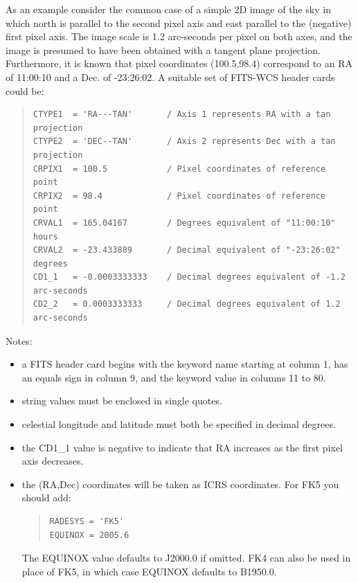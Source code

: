 \documentclass[twoside,11pt]{article}
\begin{document}
As an example consider the common case of a simple 2D image of the sky in 
which north is parallel to the second pixel axis and east parallel to the 
(negative) first pixel axis. The image scale is 1.2 arc-seconds per pixel
on both axes, and the image is presumed to have been obtained with a
tangent plane projection. Furthermore, it is known that pixel coordinates
(100.5,98.4) correspond to an RA of 11:00:10 and a Dec. of  -23:26:02.
A suitable set of FITS-WCS header cards could be:

\begin{quote}
\small
\begin{verbatim}
CTYPE1  = 'RA---TAN'       / Axis 1 represents RA with a tan projection
CTYPE2  = 'DEC--TAN'       / Axis 2 represents Dec with a tan projection
CRPIX1  = 100.5            / Pixel coordinates of reference point
CRPIX2  = 98.4             / Pixel coordinates of reference point
CRVAL1  = 165.04167        / Degrees equivalent of "11:00:10" hours
CRVAL2  = -23.433889       / Decimal equivalent of "-23:26:02" degrees
CD1_1   = -0.0003333333    / Decimal degrees equivalent of -1.2 arc-seconds
CD2_2   = 0.0003333333     / Decimal degrees equivalent of 1.2 arc-seconds
\end{verbatim}
\normalsize
\end{quote}

Notes:
\begin{itemize}
\item a FITS header card begins with the keyword name starting at column 1, 
has an equals sign in column 9, and the keyword value in columns 11 to 80.
\item string values must be enclosed in single quotes.
\item celestial longitude and latitude must both be specified in decimal degrees.
\item the CD1\_1 value is negative to indicate that RA increases as the
first pixel axis decreases.
\item the (RA,Dec) coordinates will be taken as ICRS coordinates. For FK5
you should add:

\begin{quote}
\small
\begin{verbatim}
RADESYS = 'FK5'           
EQUINOX = 2005.6 
\end{verbatim}
\normalsize
\end{quote}

The EQUINOX value defaults to J2000.0 if omitted. FK4 can also be used in
place of FK5, in which case EQUINOX defaults to B1950.0. 

\end{itemize}
\end{document}

